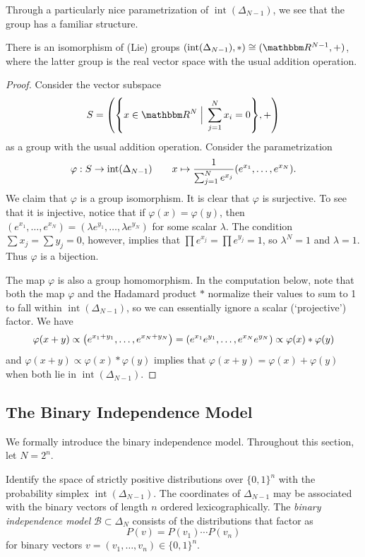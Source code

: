 \documentclass[11pt,titlepage]{article}
\newcommand*{\Bin}{\mathcal{B}}
\DeclareMathOperator{\intr}{int}
\numberwithin{equation}{section}
\begin{document}
    Through a particularly nice parametrization of $\intr(\Delta_{N-1})$, we see
    that the group has a familiar structure.
    \begin{theorem} \label{thm:dist-par}
    There is an isomorphism of (Lie) groups $(\intr(\Delta_{N-1}), *) \iso
    (\R^{N-1}, +)$, where the latter group is the real vector space with the
    usual addition operation.
    \end{theorem}
    \begin{proof}
    Consider the vector subspace
    \[
        S = \pdil*{\cdil*{x \in \R^N \;\Big\vert\; \sum_{j=1}^N x_i = 0 }, +}
    \]
    as a group with the usual addition operation.  Consider the parametrization
    \[
        \varphi : S \to \intr(\Delta_{N-1})
        \qquad
        x \mapsto \frac{1}{\sum_{j=1}^N e^{x_j}} 
        \pdil*{e^{x_1}, \ldots, e^{x_N}}.
    \]
    We claim that $\varphi$ is a group isomorphism.  It is clear that $\varphi$
    is surjective.  To see that it is injective, notice that if $\varphi(x) =
    \varphi(y)$, then $(e^{x_1}, \ldots, e^{x_N}) = (\lambda e^{y_1}, \ldots,
    \lambda e^{y_N})$ for some scalar $\lambda$.  The condition $\sum x_j = \sum
    y_j = 0$, however, implies that $\prod e^{x_j} = \prod e^{y_j} = 1$, so
    $\lambda^N = 1$ and $\lambda = 1$.  Thus $\varphi$ is a bijection.

    The map $\varphi$ is also a group homomorphism.  In the computation below,
    note that both the map $\varphi$ and the Hadamard product $*$ normalize
    their values to sum to 1 to fall within $\intr(\Delta_{N-1})$, so we can
    essentially ignore a scalar (`projective') factor.  We have
    \[
        \varphi(x + y)
        \propto
        \pdil*{e^{x_1 + y_1}, \ldots, e^{x_N + y_N}}
        =
        \pdil*{e^{x_1}e^{y_1}, \ldots, e^{x_N}e^{y_N}}
        \propto
        \varphi(x) * \varphi(y)
    \]
    and $\varphi(x + y) \propto \varphi(x) * \varphi(y)$ implies that $\varphi(x
    + y) = \varphi(x) + \varphi(y)$ when both lie in $\intr(\Delta_{N-1})$.
    \end{proof}
    

\subsection{The Binary Independence Model}

    We formally introduce the binary independence model.  Throughout this
    section, let $N = 2^n$.
    \begin{definition}
    Identify the space of strictly positive distributions over $\{0,1\}^n$ with
    the probability simplex $\intr(\Delta_{N-1})$.  The coordinates of
    $\Delta_{N-1}$ may be associated with the binary vectors of length $n$
    ordered lexicographically.  The \emph{binary independence model} $\Bin
    \subset \Delta_N$ consists of the distributions that factor as
    \[
        P(v) = P(v_1) \cdots P(v_n)
    \]
    for binary vectors $v = (v_1, \ldots, v_n) \in \{0,1\}^n$.
    \end{definition}
\end{document}
